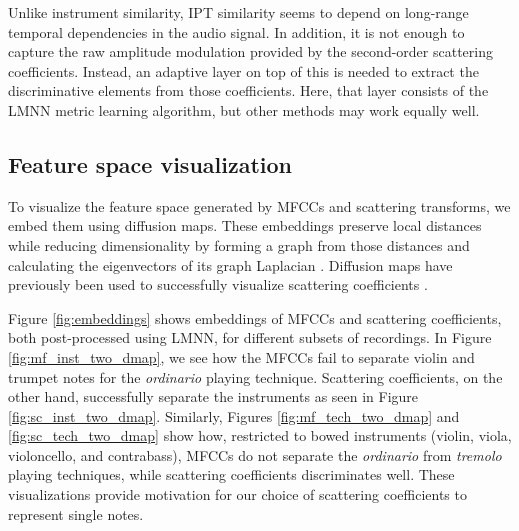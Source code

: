 Unlike instrument similarity, IPT similarity seems to depend on long-range temporal dependencies in the audio signal.
In addition, it is not enough to capture the raw amplitude modulation provided by the second-order scattering coefficients.
Instead, an adaptive layer on top of this is needed to extract the discriminative elements from those coefficients.
Here, that layer consists of the LMNN metric learning algorithm, but other methods may work equally well.

\subsection{Feature space visualization}

To visualize the feature space generated by MFCCs and scattering transforms, we embed them using diffusion maps.
These embeddings preserve local distances while reducing dimensionality by forming a graph from those distances and calculating the eigenvectors of its graph Laplacian \cite{lafon2006acha}.
Diffusion maps have previously been used to successfully visualize scattering coefficients \cite{chudacek2014embc,villoutreix2017plos}.

Figure \ref{fig:embeddings} shows embeddings of MFCCs and scattering coefficients, both post-processed using LMNN, for different subsets of recordings.
In Figure \ref{fig:mf_inst_two_dmap}, we see how the MFCCs fail to separate violin and trumpet notes for the \emph{ordinario} playing technique.
Scattering coefficients, on the other hand, successfully separate the instruments as seen in Figure \ref{fig:sc_inst_two_dmap}.
Similarly, Figures \ref{fig:mf_tech_two_dmap} and \ref{fig:sc_tech_two_dmap} show how, restricted to bowed instruments (violin, viola, violoncello, and contrabass), MFCCs do not separate the \emph{ordinario} from \emph{tremolo} playing techniques, while scattering coefficients discriminates well.
These visualizations provide motivation for our choice of scattering coefficients to represent single notes.

